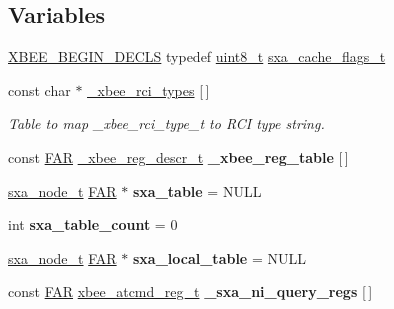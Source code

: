 \subsection*{Variables}
\begin{DoxyCompactItemize}
\item 
\hyperlink{group__hal_ga336bff4f4a6012aacc4468132bbd3d7f}{X\+B\+E\+E\+\_\+\+B\+E\+G\+I\+N\+\_\+\+D\+E\+C\+LS} typedef \hyperlink{group__hal__dos_gae1affc9ca37cfb624959c866a73f83c2}{uint8\+\_\+t} \hyperlink{group___s_x_a_ga21b45e50d83fcc1363c4239313e88c06}{sxa\+\_\+cache\+\_\+flags\+\_\+t}
\item 
const char $\ast$ \hyperlink{group___s_x_a_ga62238d483c628f8c996664ff0f47ccef}{\+\_\+xbee\+\_\+rci\+\_\+types} \mbox{[}$\,$\mbox{]}
\begin{DoxyCompactList}\small\item\em Table to map \+\_\+xbee\+\_\+rci\+\_\+type\+\_\+t to R\+CI type string. \end{DoxyCompactList}\item 
\mbox{\label{group___s_x_a_ga38e53826af221faaa9c92525dfeb8ed3}} 
const \hyperlink{group__hal_gaef060b3456fdcc093a7210a762d5f2ed}{F\+AR} \hyperlink{struct__xbee__reg__descr__t}{\+\_\+xbee\+\_\+reg\+\_\+descr\+\_\+t} {\bfseries \+\_\+xbee\+\_\+reg\+\_\+table} \mbox{[}$\,$\mbox{]}
\item 
\mbox{\label{group___s_x_a_gafaf56c450e4f885ee2d8fd0dfc0bc0a9}} 
\hyperlink{structsxa__node__t}{sxa\+\_\+node\+\_\+t} \hyperlink{group__hal_gaef060b3456fdcc093a7210a762d5f2ed}{F\+AR} $\ast$ {\bfseries sxa\+\_\+table} = N\+U\+LL
\item 
\mbox{\label{group___s_x_a_gaf690fd80428627087e91a1e1b28fad0f}} 
int {\bfseries sxa\+\_\+table\+\_\+count} = 0
\item 
\mbox{\label{group___s_x_a_ga01bfbcf717c18bfb7825eba4715b3ad4}} 
\hyperlink{structsxa__node__t}{sxa\+\_\+node\+\_\+t} \hyperlink{group__hal_gaef060b3456fdcc093a7210a762d5f2ed}{F\+AR} $\ast$ {\bfseries sxa\+\_\+local\+\_\+table} = N\+U\+LL
\item 
const \hyperlink{group__hal_gaef060b3456fdcc093a7210a762d5f2ed}{F\+AR} \hyperlink{structxbee__atcmd__reg__t}{xbee\+\_\+atcmd\+\_\+reg\+\_\+t} {\bfseries \+\_\+sxa\+\_\+ni\+\_\+query\+\_\+regs} \mbox{[}$\,$\mbox{]}
\item 

\end{DoxyCompactItemize}

